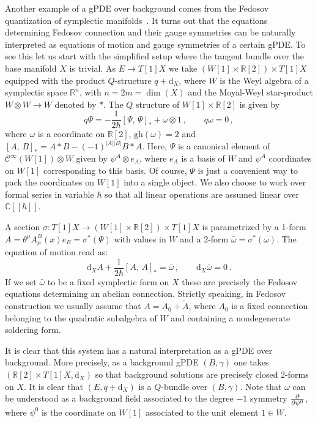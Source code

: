 \documentclass[a4paper,12pt]{article}
\numberwithin{equation}{section} %
\renewcommand{\tilde}{\widetilde}
\newcommand{\p}[1]{|#1|}
\newcommand{\gh}[1]{\mathrm{gh}(#1)}
\newcommand{\dx}{\mathrm{d}_X}
\renewcommand{\d}{\partial}
\newcommand{\tensor}{\otimes}
\newcommand{\qcommut}[2]{[#1{,}\,#2]_*}
\newcommand{\ffrac}[2]{\raisebox{.5pt}%
  {\footnotesize$\displaystyle\frac{#1}{#2}$}\kern1pt}
\newcommand{\dl}[1]{\mathchoice{\ffrac{\d}{\d #1}}{\frac{\d}{\d #1}}{\ffrac{\d}{\d #1}}{\ffrac{\d}{\d #1}}}
\newcommand{\cC}{\mathcal{C}}
\newcommand{\fC}{\mathbb{C}}
\newcommand{\fR}{\mathbb{R}}
\begin{document}
Another example of a gPDE over background comes from the Fedosov quantization of symplectic manifolds~\cite{Fedosov:1994}. It turns out that the equations determining Fedosov connection and their gauge symmetries can be naturally interpreted as equations of motion and gauge symmetries of a certain gPDE. To see this let us start with the simplified setup where the tangent bundle over the base manifold $X$ is trivial. As $E \to T[1]X$ we take $(W[1] \times \fR[2]) \times T[1]X$ equipped with the product $Q$-structure $q+\dx$, where $W$ is the Weyl algebra of a symplectic space $\fR^{n}$, with $n=2m=\dim{(X)}$ and the Moyal-Weyl star-product $W\tensor W \to W$ denoted by $*$.
The $Q$ structure of $W[1] \times \fR[2]$ is given by
\begin{equation}
q\Psi=-\frac{1}{2\hbar}\qcommut{\Psi}{\Psi}+\omega\tensor 1\,, \qquad q\omega=0\,,
\end{equation}
where $\omega$ is a coordinate on $\fR[2]$, $\gh{\omega}=2$ and $\qcommut{A}{B}=A*B-(-1)^{\p{A}\p{B}}B*A$. Here, $\Psi$ is a canonical element of $\cC^\infty(W[1])\tensor W$ given by $\psi^A\tensor e_A$, where $e_A$ is a basis  of $W$ and $\psi^A$ coordinates on $W[1]$ corresponding to this basis. Of course, $\Psi$ is just a convenient way to pack the coordinates on $W[1]$ into a single object. We also choose to work over formal series in variable $\hbar$ so that all linear operations are assumed linear over $\fC[[\hbar]]$.

A section $\sigma:T[1]X \to (W[1]\times \fR[2])\times T[1]X$ is parametrized by a 1-form $A=\theta^\mu A^B_\mu(x) e_B=\sigma^*(\Psi)$ with values in $W$ and a 2-form $\bar\omega=\sigma^*(\omega)$. The equation of motion read as:
\begin{equation}
\dx A+\frac{1}{2\hbar}\qcommut{A}{A}=\bar\omega\,, \qquad \dx \bar\omega=0\,.
\end{equation}
If we set $\bar\omega$ to be a fixed symplectic form on $X$ these are precisely the Fedosov equations determining an abelian connection. Strictly speaking, in Fedosov construction we usually assume that $A=A_0+\tilde A$, where $A_0$ is a fixed connection belonging to the quadratic subalgebra of $W$ and containing a nondegenerate soldering form.

It is clear that this system has a natural interpretation as a gPDE over background. More precisely, as a background gPDE $(B,\gamma)$ one takes $(\fR[2]\times T[1]X,\dx)$ so that background solutions are precisely closed 2-forms on $X$. It is clear that $(E,q+\dx)$ is a $Q$-bundle over $(B,\gamma)$. Note that $\omega$
can be understood as a background field associated to the degree $-1$ symmetry $\dl{\psi^0}$, where $\psi^0$
is the coordinate on $W[1]$ associated to the unit element $1\in W$. 
\end{document}
